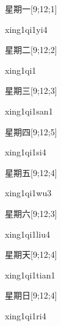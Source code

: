 \begin{verbete}[xing1qi1yi4]{星期一}[9;12;1]
\begin{pronuncia}{xing1qi1yi4}
\end{pronuncia}
\end{verbete}

\begin{verbete}[xing1qi1]{星期二}[9;12;2]
\begin{pronuncia}{xing1qi1}
\end{pronuncia}
\end{verbete}

\begin{verbete}{星期三}[9;12;3]
\begin{pronuncia}{xing1qi1san1}
\end{pronuncia}
\end{verbete}

\begin{verbete}[xing1qi1si4]{星期四}[9;12;5]
\begin{pronuncia}{xing1qi1si4}
\end{pronuncia}
\end{verbete}

\begin{verbete}[xing1qi1wu3]{星期五}[9;12;4]
\begin{pronuncia}{xing1qi1wu3}
\end{pronuncia}
\end{verbete}

\begin{verbete}{星期六}[9;12;3]
\begin{pronuncia}{xing1qi1liu4}
\end{pronuncia}
\end{verbete}

\begin{verbete}{星期天}[9;12;4]
\begin{pronuncia}{xing1qi1tian1}
\end{pronuncia}
\end{verbete}

\begin{verbete}[xing1qi1ri4]{星期日}[9;12;4]
\begin{pronuncia}{xing1qi1ri4}
\end{pronuncia}
\end{verbete}

